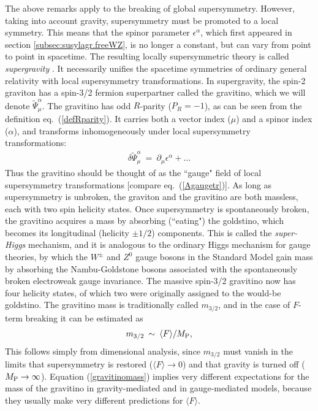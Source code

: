 \documentclass[12pt]{article}
\def\beq{\begin{eqnarray}}
\def\eeq{\end{eqnarray}}
\def\stilde{\widetilde}
\def\MPlanck{M_{\rm P}}
\begin{document}
The above remarks apply to the breaking of global supersymmetry. However, 
taking into account gravity, supersymmetry must be promoted to a local 
symmetry. This means that the spinor parameter $\epsilon^\alpha$, which 
first appeared in section \ref{subsec:susylagr.freeWZ}, is no longer a 
constant, but can vary from point to point in spacetime. The resulting 
locally supersymmetric theory is called {\it supergravity} 
\cite{supergravity,superconformalsupergravity}. 
It necessarily unifies the spacetime 
symmetries of ordinary general relativity with local supersymmetry 
transformations. In supergravity, the spin-2 graviton has a spin-3/2 
fermion superpartner called the gravitino, which we will denote $\stilde 
\Psi_\mu^\alpha$. The gravitino has odd $R$-parity ($P_R=-1$), as can be 
seen from the definition eq.~(\ref{defRparity}). It carries both a vector 
index ($\mu$) and a spinor index ($\alpha$), and transforms 
inhomogeneously under local supersymmetry transformations:
\beq
\delta \stilde\Psi_\mu^\alpha \>=\> 
\partial_\mu\epsilon^\alpha +\ldots
\label{gravitinoisgauge}
\eeq
Thus the gravitino should be thought of as the ``gauge" field of local
supersymmetry transformations [compare eq.~(\ref{Agaugetr})]. As long as
supersymmetry is unbroken, the graviton and the gravitino are both
massless, each with two spin helicity states. Once supersymmetry is
spontaneously broken, the gravitino acquires a mass by absorbing
(``eating") the goldstino, which becomes its longitudinal (helicity $\pm
1/2$) components. This is called the {\it super-Higgs} mechanism, and it
is analogous to the ordinary Higgs mechanism for gauge theories, by which the
$W^\pm$ and $Z^0$ gauge bosons in the Standard Model gain mass by
absorbing the Nambu-Goldstone bosons associated with the spontaneously
broken electroweak gauge invariance. The massive spin-3/2 gravitino now
has four helicity states, of which two were originally assigned to the
would-be goldstino. The gravitino mass is traditionally called $m_{3/2}$,
and in the case of $F$-term breaking it can be estimated as
\cite{gravitinomassref}
\beq
m_{3/2} \>\sim\> {\langle F \rangle / \MPlanck},
\label{gravitinomass}
\eeq
This follows simply from dimensional analysis, since $m_{3/2}$ must vanish 
in the limits that supersymmetry is restored ($\langle F \rangle 
\rightarrow 0$) and that gravity is turned off ($\MPlanck \rightarrow 
\infty$). 
Equation (\ref{gravitinomass}) implies very different expectations for the 
mass of the gravitino in gravity-mediated and in gauge-mediated models, 
because they usually make very different predictions for $\langle F 
\rangle$.
\end{document}
